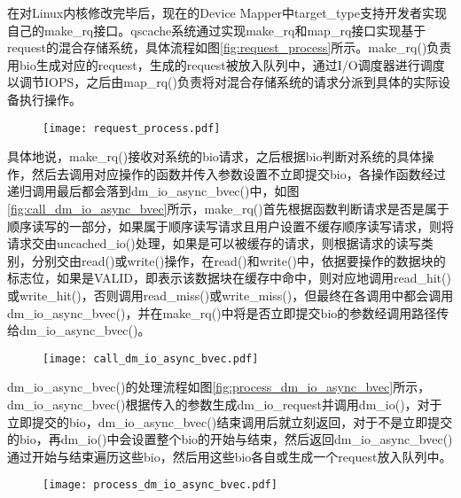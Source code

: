 在对Linux内核修改完毕后，现在的Device Mapper中target\_type支持开发者实现自己的make\_rq接口。qscache系统通过实现make\_rq和map\_rq接口实现基于request的混合存储系统，具体流程如图\ref{fig:request_process}所示。make\_rq()负责用bio生成对应的request，生成的request被放入队列中，通过I/O调度器进行调度以调节IOPS，之后由map\_rq()负责将对混合存储系统的请求分派到具体的实际设备执行操作。

\begin{figure}[!htbp]
    \centering
    \texttt{[image: request\_process.pdf]}


\end{figure}

具体地说，make\_rq()接收对系统的bio请求，之后根据bio判断对系统的具体操作，然后去调用对应操作的函数并传入参数设置不立即提交bio，各操作函数经过递归调用最后都会落到dm\_io\_async\_bvec()中，如图\ref{fig:call_dm_io_async_bvec}所示，make\_rq()首先根据函数判断请求是否是属于顺序读写的一部分，如果属于顺序读写请求且用户设置不缓存顺序读写请求，则将请求交由uncached\_io()处理，如果是可以被缓存的请求，则根据请求的读写类别，分别交由read()或write()操作，在read()和write()中，依据要操作的数据块的标志位，如果是VALID，即表示该数据块在缓存中命中，则对应地调用read\_hit()或write\_hit()，否则调用read\_miss()或write\_miss()，但最终在各调用中都会调用dm\_io\_async\_bvec()，并在make\_rq()中将是否立即提交bio的参数经调用路径传给dm\_io\_async\_bvec()。

\begin{figure}[!htbp]
    \centering
    \texttt{[image: call\_dm\_io\_async\_bvec.pdf]}

    \vskip -1cm

\end{figure}

dm\_io\_async\_bvec()的处理流程如图\ref{fig:process_dm_io_async_bvec}所示，dm\_io\_async\_bvec()根据传入的参数生成dm\_io\_request并调用dm\_io()，对于立即提交的bio，dm\_io\_async\_bvec()结束调用后就立刻返回，对于不是立即提交的bio，再dm\_io()中会设置整个bio的开始与结束，然后返回dm\_io\_async\_bvec()通过开始与结束遍历这些bio，然后用这些bio各自或生成一个request放入队列中。

\begin{figure}[H]
    \centering
    \texttt{[image: process\_dm\_io\_async\_bvec.pdf]}

    \vskip -1cm

\end{figure}

